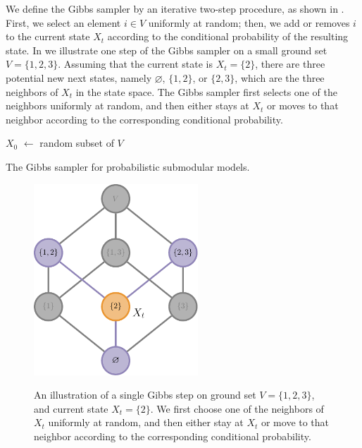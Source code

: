 We define the Gibbs sampler by an iterative two-step procedure, as shown in .
First, we select an element $i \in V$ uniformly at random; then, we add or removes $i$ to the current state $X_t$ according to the conditional probability of the resulting state.
In  we illustrate one step of the Gibbs sampler on a small ground set $V = \{1, 2, 3\}$.
Assuming that the current state is $X_t = \{2\}$, there are three potential new next states, namely $\varnothing$, $\{1, 2\}$, or $\{2, 3\}$, which are the three neighbors of $X_t$ in the state space.
The Gibbs sampler first selects one of the neighbors uniformly at random, and then either stays at $X_t$ or moves to that neighbor according to the corresponding conditional probability.

\begin{algorithm}[tb]
    \DontPrintSemicolon
    \vspace{0.5em}
	$X_0$ $\gets$ random subset of $V$\\
	\caption{The Gibbs sampler for probabilistic submodular models.}
	\label{alg:gibbs}
\end{algorithm}

\begin{figure}[htb]
\centering
\includegraphics[width=0.55\textwidth]{figures/gibbs/lattice_gibbs_2.pdf}\\[1em]
\caption{An illustration of a single Gibbs step on ground set $V = \{1, 2, 3\}$, and current state $X_t = \{2\}$.
We first choose one of the neighbors of $X_t$ uniformly at random, and then either stay at $X_t$ or move to that neighbor according to the corresponding conditional probability.}
\label{fig:gibbs}
\end{figure}

